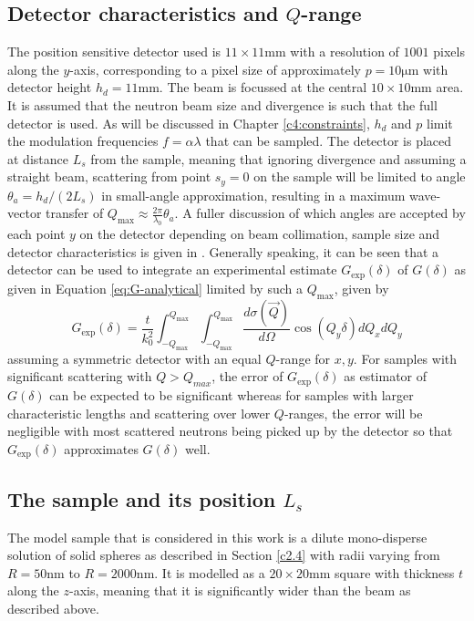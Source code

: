 \documentclass{article}
\begin{document}
\subsection{Detector characteristics and $Q$-range}
\label{c3.4}
The position sensitive detector used is $11\times11\unit{\milli\meter}$ with a resolution of $1001$ pixels along the $y$-axis, corresponding to a pixel size of approximately $p = 10\unit{\micro\meter}$ with detector height $h_d = 11\unit{\milli\meter}$. The beam is focussed at the central $10\times10\unit{\milli\meter}$ area. It is assumed that the neutron beam size and divergence is such that the full detector is used. As will be discussed in Chapter \ref{c4:constraints}, $h_d$ and $p$ limit the modulation frequencies $f = \alpha\lambda$ that can be sampled. The detector is placed at distance $L_s$ from the sample, meaning that ignoring divergence and assuming a straight beam, scattering from point $s_y = 0$ on the sample will be limited to angle $\theta_a = h_d/(2L_s)$ in small-angle approximation, resulting in a maximum wave-vector transfer of $Q_\text{max} \approx \frac{2\pi}{\lambda_0}\theta_a$. A fuller discussion of which angles are accepted by each point $y$ on the detector depending on beam collimation, sample size and detector characteristics is given in \cite{kusmin2017}. Generally speaking, it can be seen that a detector can be used to integrate an experimental estimate $G_\text{exp}(\delta)$ of $G(\delta)$ as given in Equation \eqref{eq:G-analytical} limited by such a $Q_\text{max}$, given by 
\begin{equation}
	G_\text{exp}(\delta) = \frac{t}{k_0^2}\int_{-Q_\text{max}}^{Q_\text{max}}\int_{-Q_\text{max}}^{Q_\text{max}}\dfrac{d\sigma(\vec{Q})}{d\Omega}\cos(Q_y \delta)dQ_xdQ_y  \label{eq:G-experimental}
\end{equation}
assuming a symmetric detector with an equal $Q$-range for $x,y$. For samples with significant scattering with $Q > Q_{max}$, the error of $G_\text{exp}(\delta)$ as estimator of $G(\delta)$ can be expected to be significant whereas for samples with larger characteristic lengths and scattering over lower $Q$-ranges, the error will be negligible with most scattered neutrons being picked up by the detector \cite{rekveldt1996} so that $G_\text{exp}(\delta)$ approximates $G(\delta)$ well. 

\subsection{The sample and its position $L_s$}
\label{c3.5}
The model sample that is considered in this work is a dilute mono-disperse solution of solid spheres as described in Section \ref{c2.4} with radii varying from $R = 50\unit{\nano\meter}$ to $R = 2000\unit{\nano\meter}$. It is modelled as a $20\times20\unit{\milli\meter}$ square with thickness $t$ along the $z$-axis, meaning that it is significantly wider than the beam as described above. 
 
\end{document}
